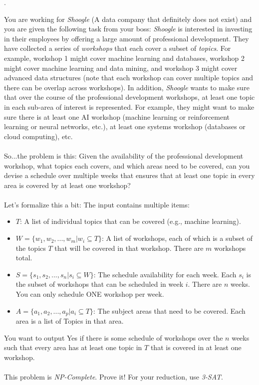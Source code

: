 \documentclass[12pt]{article}
\newcounter{quesnum}
\newcommand{\question}[2][??]{
\begin{list}{\labelitemi}{\leftmargin=2em}
\item [\arabic{quesnum}.] {} {#2}
\end{list}
\addtocounter{quesnum}{1}
}
\begin{document}
\question[3]{
You are working for \emph{Shoogle} (A data company that definitely does not exist) and you are given the following task from your boss: \emph{Shoogle} is interested in investing in their employees by offering a large amount of professional development. They have collected a series of \emph{workshops} that each cover a subset of \emph{topics}. For example, workshop 1 might cover machine learning and databases, workshop 2 might cover machine learning and data mining, and workshop 3 might cover advanced data structures (note that each workshop can cover multiple topics and there can be overlap across workshops). In addition, \emph{Shoogle} wants to make sure that over the course of the professional development workshops, at least one topic in each sub-area of interest is represented. For example, they might want to make sure there is at least one AI workshop (machine learning or reinforcement learning or neural networks, etc.), at least one systems workshop (databases or cloud computing), etc.\\
\\
So...the problem is this: Given the availability of the professional development workshop, what topics each covers, and which areas need to be covered, can you devise a schedule over multiple weeks that ensures that at least one topic in every area is covered by at least one workshop?\\
\\
Let's formalize this a bit: The input contains multiple items:

\begin{itemize}
    \item $T$: A list of individual topics that can be covered (e.g., machine learning).
    \item $W=\{w_1,w_2,...,w_m | w_i \subseteq T\}$: A list of workshops, each of which is a subset of the topics $T$ that will be covered in that workshop. There are $m$ workshops total.
    
    \item $S=\{s_1,s_2,...,s_n | s_i \subseteq W\}$: The schedule availability for each week. Each $s_i$ is the subset of workshops that can be scheduled in week $i$. There are $n$ weeks. You can only schedule ONE workshop per week.
    \item $A= \{a_1,a_2,...,a_p | a_i \subseteq T\}$: The subject areas that need to be covered. Each area is a list of Topics in that area.
\end{itemize}

You want to output Yes if there is some schedule of workshops over the $n$ weeks such that every area has at least one topic in $T$ that is covered in at least one workshop.\\
\\
This problem is \emph{NP-Complete}. Prove it! For your reduction, use \emph{3-SAT}.
}

\vspace{12pt}
\end{document}
